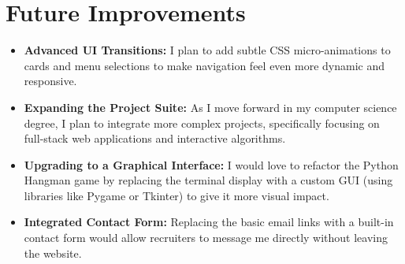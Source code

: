 \documentclass[12pt, a4paper]{report}
\begin{document}
\chapter{Future Improvements}

\begin{itemize}
  \item \textbf{Advanced UI Transitions:} I plan to add subtle CSS
        micro-animations to cards and menu selections to make navigation feel
        even more dynamic and responsive.

  \item \textbf{Expanding the Project Suite:} As I move forward in my
        computer science degree, I plan to integrate more complex projects,
        specifically focusing on full-stack web applications and interactive
        algorithms.

  \item \textbf{Upgrading to a Graphical Interface:} I would love to
        refactor the Python Hangman game by replacing the terminal display
        with a custom GUI (using libraries like Pygame or Tkinter) to give it
        more visual impact.

  \item \textbf{Integrated Contact Form:} Replacing the basic email links
        with a built-in contact form would allow recruiters to message me
        directly without leaving the website.
\end{itemize}
\end{document}
